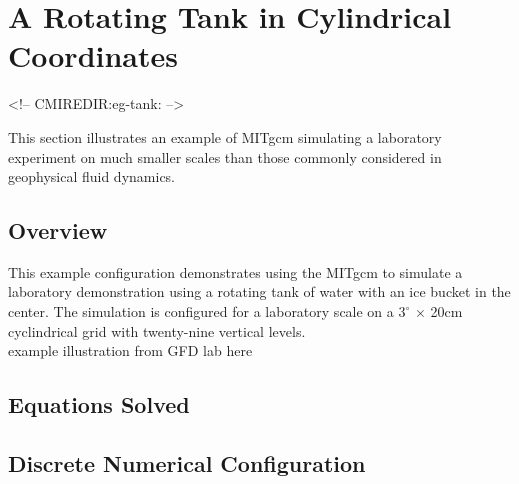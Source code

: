 

%
%

\section{A Rotating Tank in Cylindrical Coordinates}
\label{sect:eg-tank}
\label{www:tutorials}
\begin{rawhtml}
<!-- CMIREDIR:eg-tank: -->
\end{rawhtml}

This section illustrates an example of MITgcm simulating a laboratory
experiment on much smaller scales than those commonly considered in  
geophysical
fluid dynamics.

\subsection{Overview}
\label{www:tutorials}
                                                                                
                                                                                
This example configuration demonstrates using the MITgcm to simulate
a laboratory demonstration using a rotating tank of water with an ice
bucket in the center. The simulation is configured for a laboratory
scale on a
$3^{\circ}$ $\times$ 20cm
cyclindrical grid with twenty-nine vertical
levels.
\\
example illustration from GFD lab here
\\



 

\subsection{Equations Solved}
\label{www:tutorials}


\subsection{Discrete Numerical Configuration}
\label{www:tutorials}

